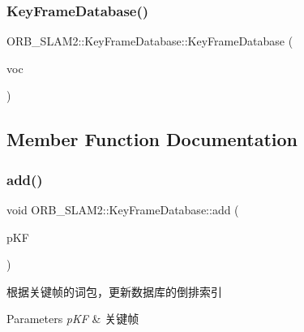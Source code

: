 \subsubsection{\texorpdfstring{Key\+Frame\+Database()}{KeyFrameDatabase()}}
{\footnotesize\ttfamily O\+R\+B\+\_\+\+S\+L\+A\+M2\+::\+Key\+Frame\+Database\+::\+Key\+Frame\+Database (\begin{DoxyParamCaption}\item[{const \mbox{\hyperlink{namespace_o_r_b___s_l_a_m2_a2fafba714858cab1bb18d438e2e83c5d}{O\+R\+B\+Vocabulary}} \&}]{voc }\end{DoxyParamCaption})}



\subsection{Member Function Documentation}
\mbox{\label{class_o_r_b___s_l_a_m2_1_1_key_frame_database_a1b3a362116e3ecf2cd7e151be2ca3fcb}} 
\subsubsection{\texorpdfstring{add()}{add()}}
{\footnotesize\ttfamily void O\+R\+B\+\_\+\+S\+L\+A\+M2\+::\+Key\+Frame\+Database\+::add (\begin{DoxyParamCaption}\item[{\mbox{\hyperlink{class_o_r_b___s_l_a_m2_1_1_key_frame}{Key\+Frame}} $\ast$}]{p\+KF }\end{DoxyParamCaption})}



根据关键帧的词包，更新数据库的倒排索引 


\begin{DoxyParams}{Parameters}
{\em p\+KF} & 关键帧 \\
\hline
\end{DoxyParams}
\mbox{\label{class_o_r_b___s_l_a_m2_1_1_key_frame_database_a3eccf99ba2e387d0273f919fd0574ea2}} 
